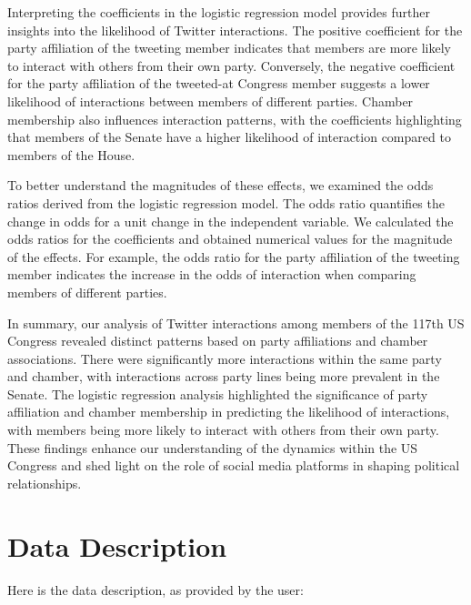 \documentclass[11pt]{article}
\begin{document}
Interpreting the coefficients in the logistic regression model provides further insights into the likelihood of Twitter interactions. The positive coefficient for the party affiliation of the tweeting member indicates that members are more likely to interact with others from their own party. Conversely, the negative coefficient for the party affiliation of the tweeted-at Congress member suggests a lower likelihood of interactions between members of different parties. Chamber membership also influences interaction patterns, with the coefficients highlighting that members of the Senate have a higher likelihood of interaction compared to members of the House.

To better understand the magnitudes of these effects, we examined the odds ratios derived from the logistic regression model. The odds ratio quantifies the change in odds for a unit change in the independent variable. We calculated the odds ratios for the coefficients and obtained numerical values for the magnitude of the effects. For example, the odds ratio for the party affiliation of the tweeting member indicates the increase in the odds of interaction when comparing members of different parties.

In summary, our analysis of Twitter interactions among members of the 117th US Congress revealed distinct patterns based on party affiliations and chamber associations. There were significantly more interactions within the same party and chamber, with interactions across party lines being more prevalent in the Senate. The logistic regression analysis highlighted the significance of party affiliation and chamber membership in predicting the likelihood of interactions, with members being more likely to interact with others from their own party. These findings enhance our understanding of the dynamics within the US Congress and shed light on the role of social media platforms in shaping political relationships.


\clearpage
\appendix

\section{Data Description} \label{sec:data_description} Here is the data description, as provided by the user:
\end{document}
